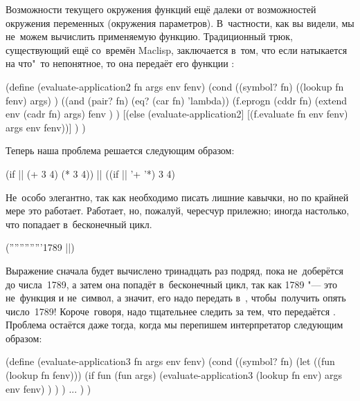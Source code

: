 Возможности текущего окружения функций ещё далеки от возможностей окружения
переменных (окружения параметров). В~частности, как вы видели, мы не~можем
вычислить применяемую функцию. Традиционный трюк, существующий ещё со~времён
Maclisp, заключается в~том, что если  натыкается на
что"~то непонятное, то она передаёт его функции :

\begin{code:lisp}
(define (evaluate-application2 fn args env fenv)
  (cond ((symbol? fn)
         ((lookup fn fenv) args) )
        ((and (pair? fn) (eq? (car fn) 'lambda))
         (f.eprogn (cddr fn)
                   (extend env (cadr fn) args)
                   fenv ) )
        [(else (evaluate-application2]
               [(f.evaluate fn env fenv) args env fenv))] ) )
\end{code:lisp}

Теперь наша проблема решается следующим образом:

\begin{code:lisp}
(if || (+ 3 4) (* 3 4)) |\eq| ((if || '+ '*) 3 4)
\end{code:lisp}

Не~особо элегантно, так как необходимо писать лишние кавычки, но по крайней мере
это работает. Работает, но, пожалуй, чересчур прилежно; иногда настолько, что
попадает в~бесконечный цикл.

\begin{code:lisp}
('''''''''''''1789 ||)
\end{code:lisp}

Выражение  сначала будет
вычислено тринадцать раз подряд, пока  не~доберётся до
числа~1789, а затем она попадёт в~бесконечный цикл, так как 1789 "--- это
не~функция и не~символ, а значит, его надо передать в~,
чтобы\textdots\ получить опять число~1789! Короче~говоря, надо тщательнее
следить за тем, что передаётся . Проблема остаётся даже тогда,
когда мы перепишем интерпретатор следующим образом:

\begin{code:lisp}
(define (evaluate-application3 fn args env fenv)
  (cond
    ((symbol? fn)
     (let ((fun (lookup fn fenv)))
       (if fun (fun args)
           (evaluate-application3 (lookup fn env) args env fenv) ) ) )
    ... ) )
\end{code:lisp}

